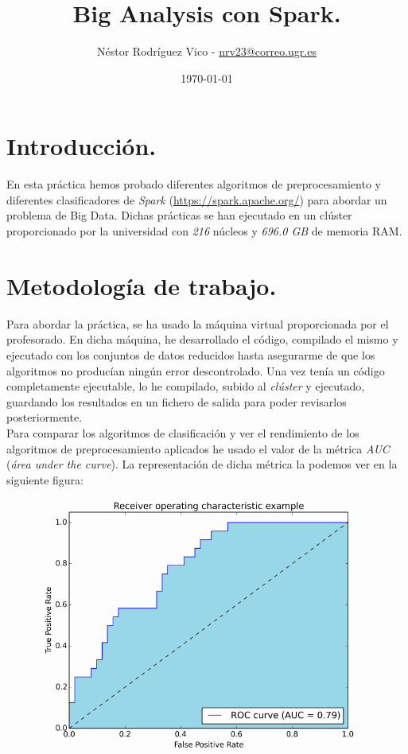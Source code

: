 \documentclass[11pt]{article}
\title{Big Analysis con Spark.}
\author{Néstor Rodríguez Vico - \href{mailto:nrv23@correo.ugr.es}{nrv23@correo.ugr.es}}
\date{\today}
\begin{document}
\maketitle

\section{Introducción.}

En esta práctica hemos probado diferentes algoritmos de preprocesamiento y diferentes clasificadores de \textit{Spark} (\href{https://spark.apache.org/}{https://spark.apache.org/}) para abordar un problema de Big Data. Dichas prácticas se han ejecutado en un clúster proporcionado por la universidad con \textit{216} núcleos y \textit{696.0 GB} de memoria RAM.

\section{Metodología de trabajo.}

Para abordar la práctica, se ha usado la máquina virtual proporcionada por el profesorado. En dicha máquina, he desarrollado el código, compilado el mismo y ejecutado con los conjuntos de datos reducidos hasta asegurarme de que los algoritmos no producían ningún error descontrolado. Una vez tenía un código completamente ejecutable, lo he compilado, subido al \textit{clúster} y ejecutado, guardando los resultados en un fichero de salida para poder revisarlos posteriormente. \\

Para comparar los algoritmos de clasificación y ver el rendimiento de los algoritmos de preprocesamiento aplicados he usado el valor de la métrica \textit{AUC} (\textit{área under the curve}). La representación de dicha métrica la podemos ver en la siguiente figura:

\begin{figure}[H]
	\centering
	\includegraphics[width=0.5\linewidth]{images/AUC.png}
\end{figure}
\end{document}
